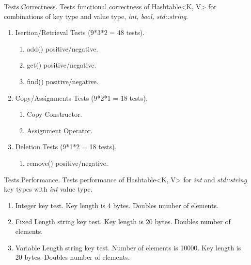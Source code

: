 \documentclass{beamer}
\begin{document}
\begin{frame}{Tests.}{Correctness.}
  Tests functional correctness of Hashtable<K, V> for combinations of
  key type and value type, \textit{int, bool, std::string}. 
  \begin{enumerate}
    \item Isertion/Retrieval Tests (9*3*2 = 48 tests).   
      \begin{enumerate}
      \item add() positive/negative.
      \item get() positive/negative.
      \item find() positive/negative.
      \end{enumerate}
    \item Copy/Assignments Tests (9*2*1 = 18 tests). 
      \begin{enumerate}
      \item Copy Constructor.
      \item Assignment Operator.
      \end{enumerate}
    \item  Deletion Tests (9*1*2 = 18 tests).
      \begin{enumerate}
        \item remove() positive/negative. 
      \end{enumerate}
  \end{enumerate}
\end{frame}

\begin{frame}{Tests.}{Performance.}
  Tests performance of Hashtable<K, V> for \textit{int} and \textit{std::string}
  key types with \textit{int} value type.
  \begin{enumerate}
    \item Integer key test. Key length is 4 bytes. Doubles number of elements.
    \item Fixed Length string key test. Key length is 20 bytes. Doubles number of elements. 
    \item Variable Length string key test. Number of elements is 10000. Key length is 20 bytes. Doubles number of elements. 
  \end{enumerate}
\end{frame}
\end{document}
